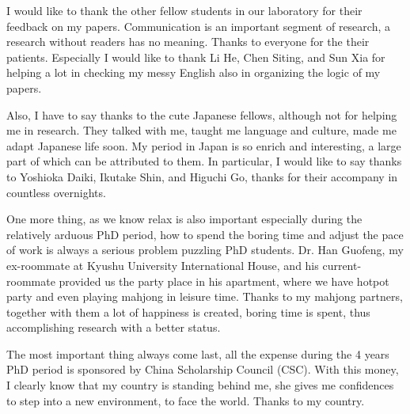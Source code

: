 \documentclass[12pt, twoside, a4paper]{book} %
\begin{document}
I would like to thank the other fellow students in our laboratory for their feedback on my papers. Communication is an important segment of research, a research without readers has no meaning. Thanks to everyone for the their patients. Especially I would like to thank Li He, Chen Siting, and Sun Xia for helping a lot in checking my messy English also in organizing the logic of my papers. 

Also, I have to say thanks to the cute Japanese fellows, although not for helping me in research. They talked with me, taught me language and culture, made me adapt Japanese life soon. My period in Japan is so enrich and interesting, a large part of which can be attributed to them. In particular, I would like to say thanks to Yoshioka Daiki, Ikutake Shin, and Higuchi Go, thanks for their accompany in countless overnights.

One more thing, as we know relax is also important especially during the relatively arduous PhD period, how to spend the boring time and adjust the pace of work is always a serious problem puzzling PhD students. Dr. Han Guofeng, my ex-roommate at Kyushu University International House, and his current-roommate provided us the party place in his apartment, where we have hotpot party and even playing mahjong in leisure time. Thanks to my mahjong partners, together with them a lot of happiness is created, boring time is spent, thus accomplishing research with a better status.

The most important thing always come last, all the expense during the 4 years PhD period is sponsored by China Scholarship Council (CSC). With this money, I clearly know that my country is standing behind me, she gives me confidences to step into a new environment, to face the world. Thanks to my country.

\end{document}
